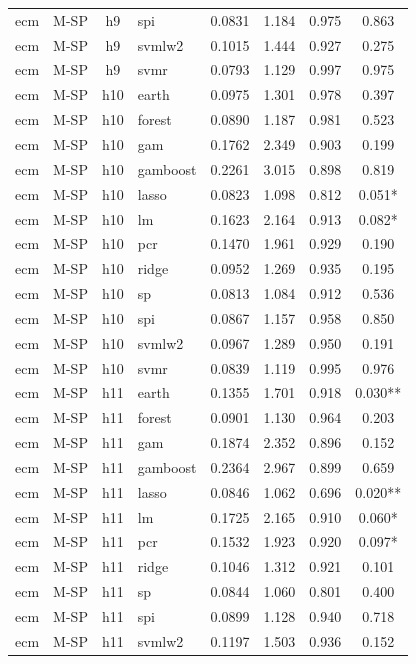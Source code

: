 \begin{ThreePartTable}
\begin{longtable}[t]{llclcccc}
ecm & M-SP & h9 & spi & 0.0831 & 1.184 & 0.975 & 0.863\\
ecm & M-SP & h9 & svmlw2 & 0.1015 & 1.444 & 0.927 & 0.275\\
ecm & M-SP & h9 & svmr & 0.0793 & 1.129 & 0.997 & 0.975\\
\addlinespace
ecm & M-SP & h10 & earth & 0.0975 & 1.301 & 0.978 & 0.397\\
ecm & M-SP & h10 & forest & 0.0890 & 1.187 & 0.981 & 0.523\\
ecm & M-SP & h10 & gam & 0.1762 & 2.349 & 0.903 & 0.199\\
ecm & M-SP & h10 & gamboost & 0.2261 & 3.015 & 0.898 & 0.819\\
ecm & M-SP & h10 & lasso & 0.0823 & 1.098 & 0.812 & 0.051*\\
ecm & M-SP & h10 & lm & 0.1623 & 2.164 & 0.913 & 0.082*\\
ecm & M-SP & h10 & pcr & 0.1470 & 1.961 & 0.929 & 0.190\\
ecm & M-SP & h10 & ridge & 0.0952 & 1.269 & 0.935 & 0.195\\
ecm & M-SP & h10 & sp & 0.0813 & 1.084 & 0.912 & 0.536\\
ecm & M-SP & h10 & spi & 0.0867 & 1.157 & 0.958 & 0.850\\
ecm & M-SP & h10 & svmlw2 & 0.0967 & 1.289 & 0.950 & 0.191\\
ecm & M-SP & h10 & svmr & 0.0839 & 1.119 & 0.995 & 0.976\\
\addlinespace
ecm & M-SP & h11 & earth & 0.1355 & 1.701 & 0.918 & 0.030**\\
ecm & M-SP & h11 & forest & 0.0901 & 1.130 & 0.964 & 0.203\\
ecm & M-SP & h11 & gam & 0.1874 & 2.352 & 0.896 & 0.152\\
ecm & M-SP & h11 & gamboost & 0.2364 & 2.967 & 0.899 & 0.659\\
ecm & M-SP & h11 & lasso & 0.0846 & 1.062 & 0.696 & 0.020**\\
ecm & M-SP & h11 & lm & 0.1725 & 2.165 & 0.910 & 0.060*\\
ecm & M-SP & h11 & pcr & 0.1532 & 1.923 & 0.920 & 0.097*\\
ecm & M-SP & h11 & ridge & 0.1046 & 1.312 & 0.921 & 0.101\\
ecm & M-SP & h11 & sp & 0.0844 & 1.060 & 0.801 & 0.400\\
ecm & M-SP & h11 & spi & 0.0899 & 1.128 & 0.940 & 0.718\\
ecm & M-SP & h11 & svmlw2 & 0.1197 & 1.503 & 0.936 & 0.152\\

\end{longtable}
\end{ThreePartTable}
